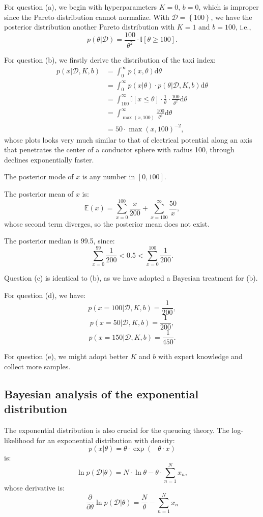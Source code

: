 \documentclass[UTF8]{ctexart}
\begin{document}
For question (a), we begin with hyperparameters $K=0$, $b=0$, which is improper since the Pareto distribution cannot normalize.
With $\mathcal{D}=\left\{100\right\}$, we have the posterior distribution another Pareto distribution with $K=1$ and $b=100$, i.e.,
$$p(\theta|\mathcal{D})=\frac{100}{\theta^{2}}\cdot\mathbb{I}[\theta\geq 100].$$

For question (b), we firstly derive the distribution of the taxi index:
$$
\begin{aligned}
p(x|\mathcal{D},K,b)&=\int_{0}^{\infty}p(x,\theta)\text{d}\theta\\
&=\int_{0}^{\infty}p(x|\theta)\cdot p(\theta|\mathcal{D},K,b)\text{d}\theta\\
&=\int_{100}^{\infty}\mathbb{I}[x\leq\theta]\cdot\frac{1}{\theta}\cdot\frac{100}{\theta^{2}}\text{d}\theta\\
&=\int_{\max(x,100)}^{\infty}\frac{100}{\theta^{3}}\text{d}\theta\\
&=50\cdot\max(x,100)^{-2},
\end{aligned}
$$
whose plots looks very much similar to that of electrical potential along an axis that penetrates the center of a conductor sphere with radius 100, through declines exponentially faster.

The posterior mode of $x$ is any number in $[0,100]$.

The posterior mean of $x$ is:
$$\mathbb{E}(x)=\sum_{x=0}^{100}\frac{x}{200}+\sum_{x=100}^{\infty}\frac{50}{x},$$
whose second term diverges, so the posterior mean does not exist.

The posterior median is 99.5, since:
$$\sum_{x=0}^{99}\frac{1}{200}<0.5<\sum_{x=0}^{100}\frac{1}{200}.$$

Question (c) is identical to (b), as we have adopted a Bayesian treatment for (b).

For question (d), we have:
$$p(x=100|\mathcal{D},K,b)=\frac{1}{200},$$
$$p(x=50|\mathcal{D},K,b)=\frac{1}{200},$$
$$p(x=150|\mathcal{D},K,b)=\frac{1}{450}.$$

For question (e), we might adopt better $K$ and $b$ with expert knowledge and collect more samples.

\subsection{Bayesian analysis of the exponential distribution}
The exponential distribution is also crucial for the queueing theory.
The log-likelihood for an exponential distribution with density:
$$p(x|\theta)=\theta\cdot \exp(-\theta\cdot x)$$
is:
$$\ln p(\mathcal{D}|\theta) = N\cdot\ln \theta - \theta\cdot \sum_{n=1}^{N}x_{n},$$
whose derivative is:
$$\frac{\partial}{\partial \theta} \ln p(\mathcal{D}|\theta) = \frac{N}{\theta} - \sum_{n=1}^{N}x_{n}$$
\end{document}
